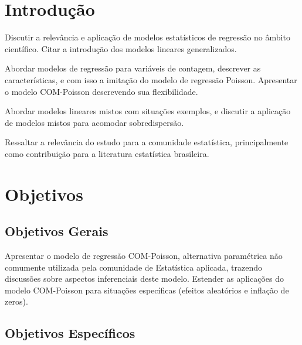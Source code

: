 \documentclass[
	12pt,				%
	openright,			%
	oneside,			%
	a4paper,			%
	english,			%
	brazil,				%
	]{abntex2}
\begin{document}

\imprimirfolhaderosto

\tableofcontents*
\cleardoublepage


\textual

\chapter{Introdução}

Discutir a relevância e aplicação de modelos estatísticos 
de regressão no âmbito científico. Citar a introdução dos 
modelos lineares generalizados.

Abordar modelos de regressão para variáveis de contagem, 
descrever as características, e com isso a imitação do 
modelo de regressão Poisson. Apresentar o modelo COM-Poisson
descrevendo sua flexibilidade.

Abordar modelos lineares mistos com situações exemplos, e 
discutir a aplicação de modelos mistos para acomodar 
sobredispersão.

Ressaltar a relevância do estudo para a comunidade 
estatística, principalmente como contribuição para a 
literatura estatística brasileira.


\chapter{Objetivos}
\section{Objetivos Gerais}

Apresentar o modelo de regressão COM-Poisson, alternativa 
paramétrica não comumente utilizada pela comunidade de 
Estatística aplicada, trazendo discussões sobre aspectos 
inferenciais deste modelo. Estender as aplicações do modelo
COM-Poisson para situações específicas (efeitos aleatórios 
e inflação de zeros).

\section{Objetivos Específicos}
\end{document}

